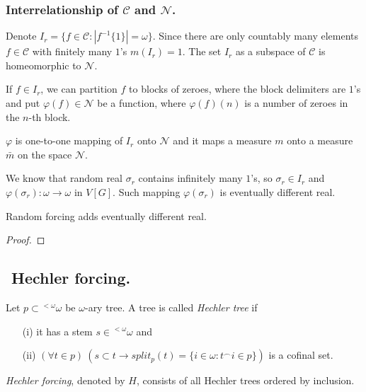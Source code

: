 \subsubsection{Interrelationship of $\mathcal C$ and $\mathcal N$.}

Denote $I_r = \{ f \in \mathcal C : |f^{-1}\{1\}| = \omega\}$.
Since there are only countably many
elements $f \in \mathcal C$ with finitely many $1$'s
$m(I_r) = 1$. The set $I_r$ as a subspace of $\mathcal C$ is
homeomorphic to $\mathcal N$.

If $f \in I_r$, we can partition $f$ to blocks of zeroes, where
the block delimiters are $1$'s and put $\varphi(f) \in \mathcal N$
be a function, where $\varphi (f)(n)$ is a number of zeroes in the
$n$-th block.

$\varphi$ is one-to-one mapping of $I_r$ onto $\mathcal N$ and
it maps a measure $m$ onto a measure $\bar m$ on the space $\mathcal N$.

We know that random real $\sigma_r$ contains infinitely many $1$'s, so
$\sigma_r \in I_r$ and $\varphi(\sigma_r) : \omega \to \omega$ in $V[G]$.
Such mapping $\varphi(\sigma_r)$ is eventually different real.
%

\begin{lemma}
 Random forcing adds eventually different real.
\end{lemma}

\begin{proof}

\end{proof}

\subsection{${}$ \hspace{-1em}Hechler forcing.}

Let $p \subset {}^{<\omega} \omega$ be $\omega$-ary
tree. A tree is called \emph{Hechler tree} if
\begin{itemize}
 \item[(i)] it has a stem $s \in {}^{<\omega} \omega$ and
 \item[(ii)] $(\forall t \in p) \ (s \subset t \to split_p(t) =
	\{i \in \omega : t^\smallfrown i \in p \})$
	is a cofinal set.
\end{itemize}
\emph{Hechler forcing}, denoted by $H$, consists of all Hechler trees
ordered by inclusion.

